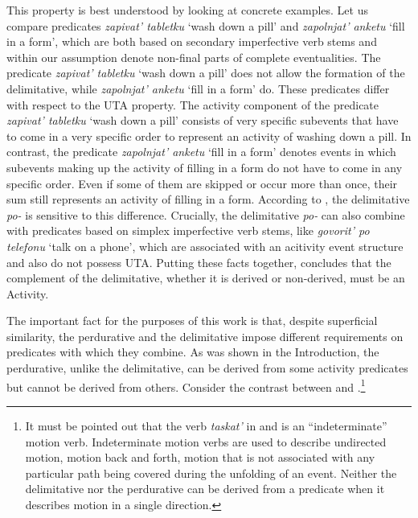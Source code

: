 \documentclass[output=paper,
]{langscibook}
\begin{document}
\noindent This property is best understood by looking at concrete examples. Let us compare predicates \textit{zapivat’ tabletku} `wash down a pill' and \textit{zapolnjat’ anketu} `fill in a form', which are both based on secondary imperfective verb stems and within our assumption denote non-final parts of complete eventualities. The predicate \textit{zapivat’ tabletku} `wash down a pill' does not allow the formation of the delimitative, while \textit{zapolnjat’ anketu} `fill in a form' do. These predicates differ with respect to the UTA property. The activity component of the predicate \textit{zapivat’ tabletku} `wash down a pill' consists of very specific subevents that have to come in a very specific order to represent an activity of washing down a pill. In contrast, the predicate \textit{zapolnjat’ anketu} `fill in a form' denotes events in which subevents making up the activity of filling in a form do not have to come in any specific order. Even if some of them are skipped or occur more than once, their sum still represents an activity of filling in a form. According to \citet{tatevosov2017temporal}, the delimitative \textit{po-} is sensitive to this difference. Crucially, the delimitative \textit{po-} can also combine with predicates based on simplex imperfective verb stems, like \textit{govorit’ po telefonu} `talk on a phone', which are associated with an acitivity event structure and also do not possess UTA. Putting these facts together, \citet{tatevosov2017temporal} concludes that the complement of the delimitative, whether it is derived or non-derived, must be an Activity.

The important fact for the purposes of this work is that, despite superficial similarity, the perdurative and the delimitative impose different requirements on predicates with which they combine. As was shown in the Introduction, the perdurative, unlike the delimitative, can be derived from some activity predicates but cannot be derived from others. Consider the contrast between  and .\footnote{It must be pointed out that the verb \textit{taskat’} in  and  is an ``indeterminate'' motion verb. Indeterminate motion verbs are used to describe undirected motion, motion back and forth, motion that is not associated with any particular path being covered during the unfolding of an event. Neither the delimitative nor the perdurative can be derived from a predicate when it describes motion in a single direction.}

\ea \label{ex:naumov:23} 
\z \z
\end{document}
